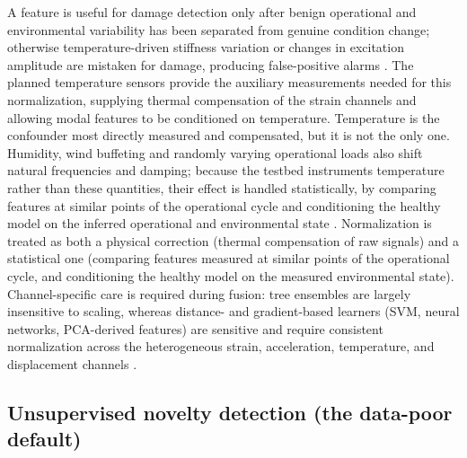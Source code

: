 A feature is useful for damage detection only after benign operational and environmental variability has been separated from genuine condition change; otherwise temperature-driven stiffness variation or changes in excitation amplitude are mistaken for damage, producing false-positive alarms \citep{farrar2013shm,figueiredo2010machine}. The planned temperature sensors provide the auxiliary measurements needed for this normalization, supplying thermal compensation of the strain channels and allowing modal features to be conditioned on temperature. Temperature is the confounder most directly measured and compensated, but it is not the only one. Humidity, wind buffeting and randomly varying operational loads also shift natural frequencies and damping; because the testbed instruments temperature rather than these quantities, their effect is handled statistically, by comparing features at similar points of the operational cycle and conditioning the healthy model on the inferred operational and environmental state \citep{figueiredo2010machine}. Normalization is treated as both a physical correction (thermal compensation of raw signals) and a statistical one (comparing features measured at similar points of the operational cycle, and conditioning the healthy model on the measured environmental state). Channel-specific care is required during fusion: tree ensembles are largely insensitive to scaling, whereas distance- and gradient-based learners (SVM, neural networks, PCA-derived features) are sensitive and require consistent normalization across the heterogeneous strain, acceleration, temperature, and displacement channels \citep{naser2023ml}.

\subsection{Unsupervised novelty detection (the data-poor default)}\label{subsec:unsupervised}

